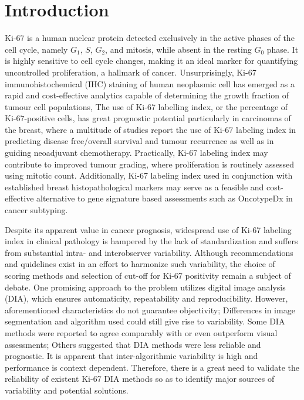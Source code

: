 \documentclass[final,1p,times]{elsarticle}
\begin{document}
\section*{Introduction}

Ki-67 is a human nuclear protein detected exclusively in the active phases of the cell cycle, namely $G_1$, $S$, $G_2$, and mitosis, while absent in the resting $G_0$ phase.\cite{Gerdes1984} It is highly sensitive to cell cycle changes, making it an ideal marker for quantifying uncontrolled proliferation, a hallmark of cancer. Unsurprisingly, Ki-67 immunohistochemical (IHC) staining of human neoplasmic cell has emerged as a rapid and cost-effective analytics capable of determining the growth fraction of tumour cell populations,  \cite{Scholzen2000} The use of Ki-67 labelling index, or the percentage of Ki-67-positive cells, has great prognostic potential particularly in carcinomas of the breast, where a multitude of studies report the use of Ki-67 labeling index in predicting disease free/overall survival and tumour recurrence \cite{Stuart-Harris2005, DeAzambuja2007, Petrelli2015} as well as in guiding neoadjuvant chemotherapy. \cite{Jones2009, Nishimura2010, Fasching2011} Practically, Ki-67 labeling index may contribute to improved tumour grading, where proliferation is routinely assessed using mitotic count. \cite{VanDiest2004} Additionally, Ki-67 labeling index used in conjunction with established breast histopathological markers may serve as a feasible and cost-effective alternative to gene signature based assessments such as OncotypeDx in cancer subtyping. \cite{Cuzick2011}

Despite its apparent value in cancer prognosis, widespread use of Ki-67 labeling index in clinical pathology is hampered by the lack of standardization and suffers from substantial intra- and interobserver variability. \cite{Dowsett2011a, Polley2013a} Although recommendations and quidelines exist in an effort to harmonize such variability, \cite{Polley2015} the choice of scoring methods and selection of cut-off for Ki-67 positivity remain a subject of debate. One promising approach to the problem utilizes digital image analysis (DIA), which ensures automaticity, repeatability and reproducibility. However, aforementioned characteristics do not guarantee objectivity; Differences in image segmentation and algorithm used could still give rise to variability. \cite{Tadrous2010} Some DIA methods were reported to agree comparably with \cite{Mohammed2012, Tang2012} or even outperform visual assessments; \cite{Laurinavicius2014, Stalhammar2016} Others suggested that DIA methods were less reliable and prognostic. \cite{Chabot-Richards2011} It is apparent that inter-algorithmic variability is high and performance is context dependent. Therefore, there is a great need to validate the reliability of existent Ki-67 DIA methods so as to identify major sources of variability and potential solutions.
\end{document}
